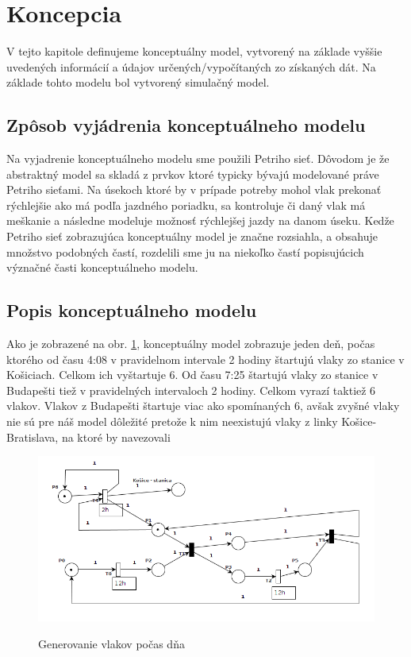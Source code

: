 \documentclass[11pt,a4paper]{article}
\begin{document}
\section{Koncepcia}
\label{sec:KONCEPCIA}

V tejto kapitole definujeme konceptuálny model, vytvorený na základe vyššie uvedených informácií a údajov určených/vypočítaných zo získaných dát.
Na základe tohto modelu bol vytvorený simulačný model.

\subsection{Zpôsob vyjádrenia konceptuálneho modelu}
\label{sec:VYJADRENIEKONCPMODELU}

Na vyjadrenie konceptuálneho modelu sme použili Petriho sieť.
Dôvodom je že abstraktný model sa skladá z prvkov ktoré typicky bývajú modelované práve Petriho sieťami.
Na úsekoch ktoré by v prípade potreby mohol vlak prekonať rýchlejšie ako má podľa jazdného poriadku, sa kontroluje či daný vlak má meškanie a následne modeluje možnosť rýchlejšej jazdy na danom úseku.
Kedže Petriho sieť zobrazujúca konceptuálny model je značne rozsiahla, a obsahuje množstvo podobných častí, rozdelili sme ju na niekoľko častí popisujúcich význačné časti konceptuálneho modelu.

\subsection{Popis konceptuálneho modelu}
\label{sec:POPISKONCMODELU}

Ako je zobrazené na obr. \ref{pic:PETSIET1}, konceptuálny model zobrazuje jeden deň, počas ktorého od času 4:08 v pravidelnom intervale 2 hodiny štartujú vlaky zo stanice v Košiciach.
Celkom ich vyštartuje 6.
Od času 7:25 štartujú vlaky zo stanice v Budapešti tiež v pravidelných intervaloch 2 hodiny.
Celkom vyrazí taktiež 6 vlakov.
Vlakov z Budapešti štartuje viac ako spomínaných 6, avšak zvyšné vlaky nie sú pre náš model dôležité pretože k nim neexistujú vlaky z linky Košice-Bratislava, na ktoré by navezovali

\begin{figure}[H]
    \begin{center}
    \scalebox{0.6}
    {
        \includegraphics{Petri_net_1.png}
    }
    \caption{Generovanie vlakov počas dňa}
    \label{pic:PETSIET1}
    \end{center}
\end{figure}
\end{document}
